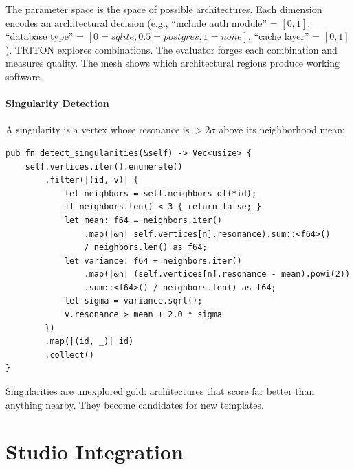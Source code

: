 \documentclass[11pt,a4paper,twoside]{article}
\theoremstyle{definition}
\theoremstyle{plain}
\theoremstyle{remark}
\begin{document}
The parameter space is the space of possible architectures. Each
dimension encodes an architectural decision (e.g., ``include auth
module'' = $[0,1]$, ``database type'' = $[0=sqlite, 0.5=postgres,
1=none]$, ``cache layer'' = $[0,1]$). TRITON explores combinations.
The evaluator forges each combination and measures quality. The mesh
shows which architectural regions produce working software.

\subsection{Singularity Detection}

A singularity is a vertex whose resonance is $> 2\sigma$ above its
neighborhood mean:
\begin{lstlisting}
pub fn detect_singularities(&self) -> Vec<usize> {
    self.vertices.iter().enumerate()
        .filter(|(id, v)| {
            let neighbors = self.neighbors_of(*id);
            if neighbors.len() < 3 { return false; }
            let mean: f64 = neighbors.iter()
                .map(|&n| self.vertices[n].resonance).sum::<f64>()
                / neighbors.len() as f64;
            let variance: f64 = neighbors.iter()
                .map(|&n| (self.vertices[n].resonance - mean).powi(2))
                .sum::<f64>() / neighbors.len() as f64;
            let sigma = variance.sqrt();
            v.resonance > mean + 2.0 * sigma
        })
        .map(|(id, _)| id)
        .collect()
}
\end{lstlisting}
Singularities are unexplored gold: architectures that score far
better than anything nearby. They become candidates for new
templates.


\part{Studio Integration}\label{part:studio}
\end{document}
